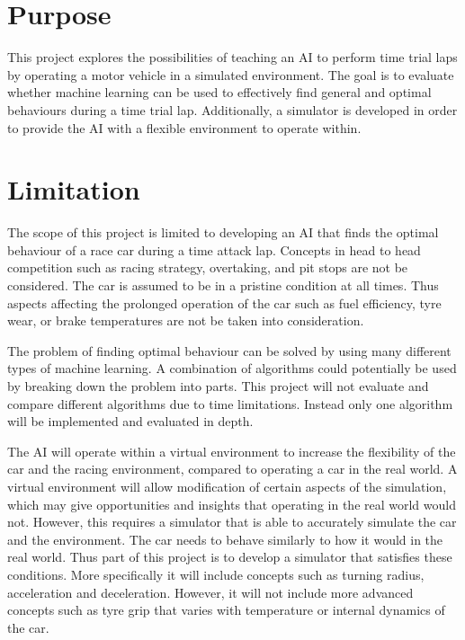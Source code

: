 \section{Purpose}
\label{purpose}
This project explores the possibilities of teaching an AI to perform time trial laps by operating a motor vehicle in a simulated environment. The goal is to evaluate whether machine learning can be used to effectively find general and optimal behaviours during a time trial lap. Additionally, a simulator is developed in order to provide the AI with a flexible environment to operate within.

\section{Limitation}

The scope of this project is limited to developing an AI that finds the optimal behaviour of a race car during a time attack lap. Concepts in head to head competition such as racing strategy, overtaking, and pit stops are not be considered. The car is assumed to be in a pristine condition at all times. Thus aspects affecting the prolonged operation of the car such as fuel efficiency, tyre wear, or brake temperatures are not be taken into consideration. 

The problem of finding optimal behaviour can be solved by using many different types of machine learning. A combination of algorithms could potentially be used by breaking down the problem into parts. This project will not evaluate and compare different algorithms due to time limitations. Instead only one algorithm will be implemented and evaluated in depth. 

The AI will operate within a virtual environment to increase the flexibility of the car and the racing environment, compared to operating a car in the real world. A virtual environment will allow modification of certain aspects of the simulation, which may give opportunities and insights that operating in the real world would not. However, this requires a simulator that is able to accurately simulate the car and the environment. The car needs to behave similarly to how it would in the real world. Thus part of this project is to develop a simulator that satisfies these conditions. More specifically it will include concepts such as turning radius, acceleration and deceleration. However, it will not include more advanced concepts such as tyre grip that varies with temperature or internal dynamics of the car.


